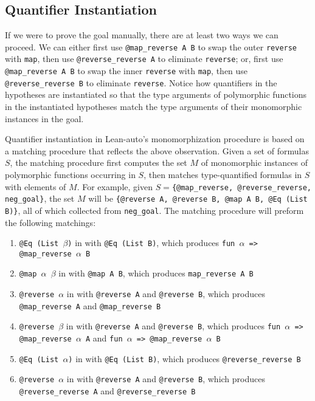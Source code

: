 \subsection{Quantifier Instantiation} \label{exinst}

If we were to prove the goal manually, there are at least two ways we can proceed. We can
either first use \texttt{@map\_reverse A B} to swap the outer \texttt{reverse} with \texttt{map}, then
use \texttt{@reverse\_reverse A} to eliminate \texttt{reverse}; or, first use
\texttt{@map\_reverse A B} to swap the inner \texttt{reverse} with \texttt{map}, then
use \texttt{@reverse\_reverse B} to eliminate \texttt{reverse}. Notice how quantifiers
in the hypotheses are instantiated so that the type arguments of polymorphic functions
in the instantiated hypotheses match the type arguments of their monomorphic instances in the goal.

Quantifier instantiation in Lean-auto's monomorphization procedure is based
on a matching procedure that reflects the above observation. Given a set of formulas $S$,
the matching procedure first computes the set $M$ of monomorphic instances of polymorphic functions occurring
in $S$, then matches type-quantified formulas in $S$ with elements of $M$. For example,
given $S=$\texttt{\{@map\_reverse, @reverse\_reverse, neg\_goal\}}, the set $M$ will be
\texttt{\{@reverse A, @reverse B, @map A B, @Eq (List B)\}}, all of which collected from \texttt{neg\_goal}.
The matching procedure will preform the following matchings:

\begin{enumerate}
  \item \texttt{@Eq (List $\beta$)} in \usebox{\vmaprev} with \texttt{@Eq (List B)},
    which produces \texttt{fun $\alpha$ => @map\_reverse $\alpha$ B}
  \item \texttt{@map $\alpha$ $\beta$} in \usebox{\vmaprev} with \texttt{@map A B},
    which produces \texttt{map\_reverse A B}
  \item \texttt{@reverse $\alpha$} in \usebox{\vmaprev} with \texttt{@reverse A} and \texttt{@reverse B},
    which produces \texttt{@map\_reverse A} and \texttt{@map\_reverse B}
  \item \texttt{@reverse $\beta$} in \usebox{\vmaprev} with \texttt{@reverse A} and \texttt{@reverse B},
    which produces \texttt{fun $\alpha$ => @map\_reverse $\alpha$ A} and \texttt{fun $\alpha$ => @map\_reverse $\alpha$ B}
  \item \texttt{@Eq (List $\alpha$)} in \usebox{\vrevrev} with \texttt{@Eq (List B)},
    which produces \texttt{@reverse\_reverse B}
  \item \texttt{@reverse $\alpha$} in \usebox{\vrevrev} with \texttt{@reverse A} and \texttt{@reverse B},
    which produces \texttt{@reverse\_reverse A} and \texttt{@reverse\_reverse B}
\end{enumerate}

